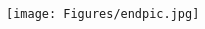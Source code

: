 \documentclass[a4paper, 12pt]{article}
\begin{document}
\begin{spacing}{1.5}
\begin{enumerate}
\end{enumerate}

\pagebreak

\begin{titlepage}
  \begin{center}
    \vspace*{8cm}

    \texttt{[image: Figures/endpic.jpg]}

  \end{center}
\end{titlepage}

\end{spacing}
\end{document}
